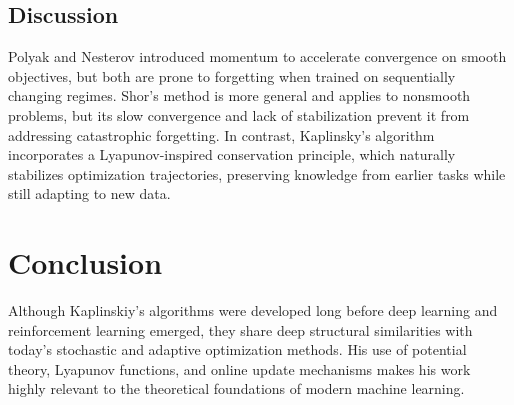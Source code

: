 \documentclass[12pt]{article}
\begin{document}
\subsection{Discussion}
Polyak and Nesterov introduced momentum to accelerate convergence on smooth objectives,
but both are prone to forgetting when trained on sequentially changing regimes.
Shor's method is more general and applies to nonsmooth problems, but its slow
convergence and lack of stabilization prevent it from addressing catastrophic
forgetting. In contrast, Kaplinsky's algorithm incorporates a Lyapunov-inspired
conservation principle, which naturally stabilizes optimization trajectories,
preserving knowledge from earlier tasks while still adapting to new data.



\section{Conclusion}
Although Kaplinskiy's algorithms were developed long before deep learning and reinforcement learning emerged, they share deep structural similarities with today's stochastic and adaptive optimization methods. His use of potential theory, Lyapunov functions, and online update mechanisms makes his work highly relevant to the theoretical foundations of modern machine learning.
\end{document}
